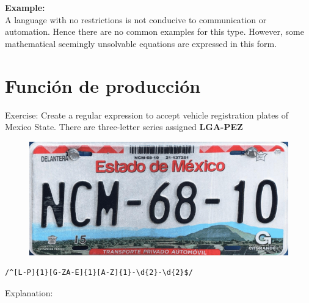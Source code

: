 \documentclass[
	12pt, %
]{fphw}
\begin{document}
\textbf{Example:}\\

A language with no restrictions is not conducive to communication or automation. Hence there are no common examples for this type. However, some mathematical seemingly unsolvable equations are expressed in this form.


\newpage
\section*{{\color{RoyalPurple}Función de producción}}

Exercise: Create a regular expression to accept vehicle registration plates of Mexico State. There are three-letter series assigned \textbf{LGA-PEZ}

\begin{figure}[H]
  \centering
  \includegraphics[scale=0.4]{images/placa_auto.png}
\end{figure}

\begin{verbatim}
/^[L-P]{1}[G-ZA-E]{1}[A-Z]{1}-\d{2}-\d{2}$/
\end{verbatim}

Explanation:\\
\end{document}
